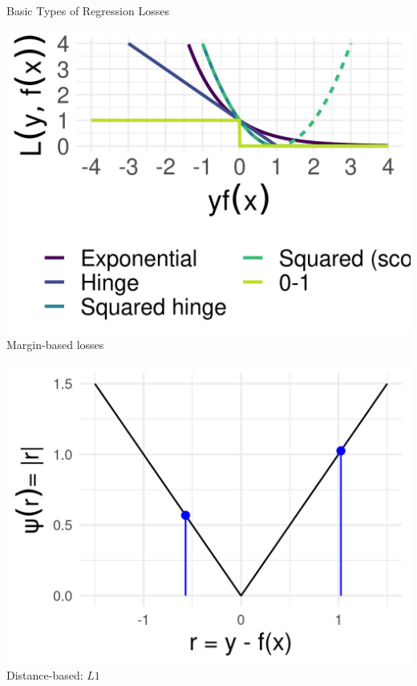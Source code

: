 \documentclass[11pt,compress,t,notes=noshow, xcolor=table]{beamer}
\begin{document}
\begin{vbframe}{Basic Types of Regression Losses}
\begin{minipage}[b]{0.25\textwidth}
  \includegraphics[width=\textwidth]{figure/plot_loss_overview_classif_2}
  \tiny \centering
  Margin-based losses
\end{minipage}%
\begin{minipage}[b]{0.25\textwidth}
  \includegraphics[width=\textwidth]{figure/loss_dist_based}
  \tiny \centering
  Distance-based: $L1$
\end{minipage}%
\begin{minipage}[b]{0.2\textwidth}

\end{minipage}
\end{vbframe}
\end{document}
